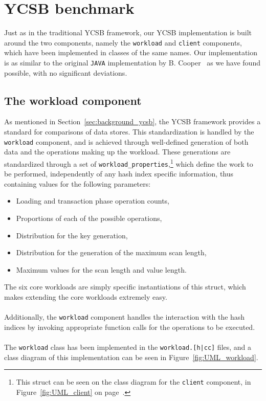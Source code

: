 \documentclass[11pt]{report} %
\begin{document}
\section{YCSB benchmark}
\label{sec:implementation_ycsb}
Just as in the traditional YCSB framework, our YCSB implementation is built around the two components, namely the \verb|workload| and \verb|client| components, which have been implemented in classes of the same names. Our implementation is as similar to the original \verb|JAVA| implementation by B. Cooper~\cite{BCycsb} as we have found possible, with no significant deviations.
\subsection{The workload component}
As mentioned in Section~\ref{sec:background_ycsb}, the YCSB framework provides a standard for comparisons of data stores. This standardization is handled by the \verb|workload| component, and is achieved through well-defined generation of both data and the operations making up the workload. These generations are standardized through a set of \verb|workload_properties|,\footnote{This struct can be seen on the class diagram for the \verb|client| component, in Figure~\ref{fig:UML_client} on page~\pageref{fig:UML_client}.}  which define the work to be performed, independently of any hash index specific information, thus containing values for the following parameters:
\begin{itemize}[noitemsep]
  \item Loading and transaction phase operation counts,
  \item Proportions of each of the possible operations,
  \item Distribution for the key generation, 
  \item Distribution for the generation of the maximum scan length,
  \item Maximum values for the scan length and value length.
\end{itemize} 
The six core workloads are simply specific instantiations of this struct, which makes extending the core workloads extremely easy. \\
\\
Additionally, the \verb|workload| component handles the interaction with the hash indices by invoking appropriate function calls for the operations to be executed. \\
\\
The \verb|workload| class has been implemented in the \verb=workload.[h|cc]= files, and a class diagram of this implementation can be seen in Figure~\ref{fig:UML_workload}. 
\end{document}
